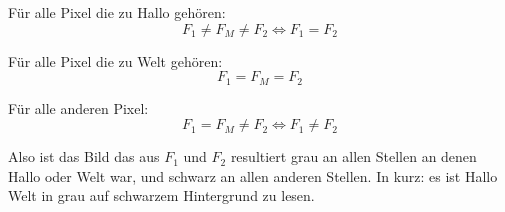 \documentclass[DIN, pagenumber=false, fontsize=11pt, parskip=half]{scrartcl}
\begin{document}
    Für alle Pixel die zu \glqq{}Hallo\grqq{} gehören:
    \begin{equation*}
        F_1 \neq F_M \neq F_2 \Leftrightarrow F_1 = F_2
    \end{equation*}

    Für alle Pixel die zu \glqq{}Welt\grqq{} gehören:
    \begin{equation*}
        F_1 = F_M = F_2
    \end{equation*}

    Für alle anderen Pixel:
    \begin{equation*}
        F_1 = F_M \neq F_2 \Leftrightarrow F_1 \neq F_2
    \end{equation*}

    Also ist das Bild das aus $F_1$ und $F_2$ resultiert grau an allen Stellen
    an denen \glqq{}Hallo\grqq{} oder \glqq{}Welt\grqq{} war, und schwarz an
    allen anderen Stellen. In kurz: es ist \glqq{}Hallo Welt\grqq{} in grau
    auf schwarzem Hintergrund zu lesen.
\end{document}
